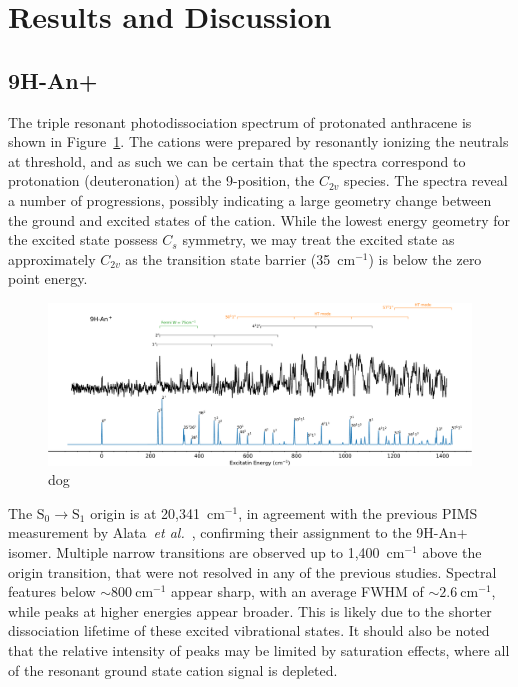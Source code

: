 \documentclass[journal=jpcafh,manuscript=article,layout=onecolumn, 12pt]{achemso}
\begin{document}
\section{Results and Discussion}
\subsection{9H-An+}
The triple resonant photodissociation spectrum of protonated anthracene is shown in Figure~\ref{Fig:4}. The cations were prepared by resonantly ionizing the neutrals at threshold, and as such we can be certain that the spectra correspond to protonation (deuteronation) at the 9-position, the $C_{2v}$ species. The spectra reveal a number of progressions, possibly indicating a large geometry change between the ground and excited states of the cation. While the lowest energy geometry for the excited state possess $C_s$ symmetry, we may treat the excited state as approximately $C_{2v}$ as the transition state barrier (35~cm$^{-1}$) is below the zero point energy.  

\begin{figure} [h]
	\includegraphics[width=1\textwidth]{figures/9H-An+w}
	\caption{dog}
	\label{Fig:4}
\end{figure}

The $\text{S}_0\rightarrow \text{S}_1$ origin is at 20,341~cm$^{-1}$, in agreement with the previous PIMS measurement by Alata~\emph{et al.}~\cite{ala10}, confirming their assignment to the 9H-An+ isomer. Multiple narrow transitions are observed up to 1,400~cm$^{-1}$ above the origin transition, that were not resolved in any of the previous studies. Spectral features below $\sim800~$cm$^{-1}$ appear sharp, with an average FWHM of $\sim 2.6~$cm$^{-1}$, while peaks at higher energies appear broader. This is likely due to the shorter dissociation lifetime of these excited vibrational states. It should also be noted that the relative intensity of peaks may be limited by saturation effects, where all of the resonant ground state cation signal is depleted.
\end{document}
